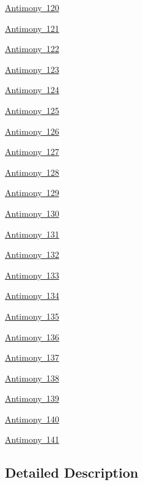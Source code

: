 \begin{DoxyCompactItemize}
\mbox{\hyperlink{group___isotope_const-_antimony-_sb120}{Antimony 120}}
\item 
\mbox{\hyperlink{group___isotope_const-_antimony-_sb121}{Antimony 121}}
\item 
\mbox{\hyperlink{group___isotope_const-_antimony-_sb122}{Antimony 122}}
\item 
\mbox{\hyperlink{group___isotope_const-_antimony-_sb123}{Antimony 123}}
\item 
\mbox{\hyperlink{group___isotope_const-_antimony-_sb124}{Antimony 124}}
\item 
\mbox{\hyperlink{group___isotope_const-_antimony-_sb125}{Antimony 125}}
\item 
\mbox{\hyperlink{group___isotope_const-_antimony-_sb126}{Antimony 126}}
\item 
\mbox{\hyperlink{group___isotope_const-_antimony-_sb127}{Antimony 127}}
\item 
\mbox{\hyperlink{group___isotope_const-_antimony-_sb128}{Antimony 128}}
\item 
\mbox{\hyperlink{group___isotope_const-_antimony-_sb129}{Antimony 129}}
\item 
\mbox{\hyperlink{group___isotope_const-_antimony-_sb130}{Antimony 130}}
\item 
\mbox{\hyperlink{group___isotope_const-_antimony-_sb131}{Antimony 131}}
\item 
\mbox{\hyperlink{group___isotope_const-_antimony-_sb132}{Antimony 132}}
\item 
\mbox{\hyperlink{group___isotope_const-_antimony-_sb133}{Antimony 133}}
\item 
\mbox{\hyperlink{group___isotope_const-_antimony-_sb134}{Antimony 134}}
\item 
\mbox{\hyperlink{group___isotope_const-_antimony-_sb135}{Antimony 135}}
\item 
\mbox{\hyperlink{group___isotope_const-_antimony-_sb136}{Antimony 136}}
\item 
\mbox{\hyperlink{group___isotope_const-_antimony-_sb137}{Antimony 137}}
\item 
\mbox{\hyperlink{group___isotope_const-_antimony-_sb138}{Antimony 138}}
\item 
\mbox{\hyperlink{group___isotope_const-_antimony-_sb139}{Antimony 139}}
\item 
\mbox{\hyperlink{group___isotope_const-_antimony-_sb140}{Antimony 140}}
\item 
\mbox{\hyperlink{group___isotope_const-_antimony-_sb141}{Antimony 141}}
\end{DoxyCompactItemize}


\subsection{Detailed Description}
